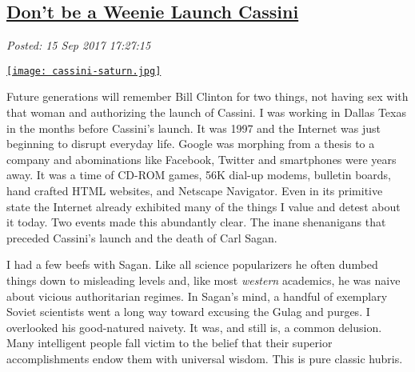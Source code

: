 %

\subsection*{\href{https://analyzethedatanotthedrivel.org/2017/09/15/dont-be-a-weenie-launch-cassini/}{Don't be a Weenie Launch Cassini}}


\noindent\emph{Posted: 15 Sep 2017 17:27:15}
\vspace{6pt}


 \captionsetup[floatingfigure]{labelformat=empty}
 \begin{floatingfigure}[l]{0.25\textwidth}
 \centering
 \href{https://bakerjd99.files.wordpress.com/2017/09/cassini-saturn.jpg}{\texttt{[image: cassini-saturn.jpg]}}
 \label{fig:5466x0}
 \end{floatingfigure} Future
generations will remember Bill Clinton for two things, not having sex
with that woman and authorizing the launch of Cassini. I was working in
Dallas Texas in the months before Cassini's launch. It was 1997 and the
Internet was just beginning to disrupt everyday life. Google was
morphing from a thesis to a company and abominations like Facebook,
Twitter and smartphones were years away. It was a time of CD-ROM games,
56K dial-up modems, bulletin boards, hand crafted HTML websites, and
Netscape Navigator. Even in its primitive state the Internet already
exhibited many of the things I value and detest about it today. Two events
made this abundantly clear. The inane shenanigans that preceded
Cassini's launch and the death of Carl Sagan.

I had a few beefs with Sagan. Like all science popularizers he often
dumbed things down to misleading levels and, like most \emph{western}
academics, he was naive about vicious authoritarian regimes. In Sagan's
mind, a handful of exemplary Soviet scientists went a long way toward
excusing the Gulag and purges. I overlooked his good-natured naivety. It
was, and still is, a common delusion. Many intelligent people fall
victim to the belief that their superior accomplishments endow them with
universal wisdom. This is pure classic hubris.

